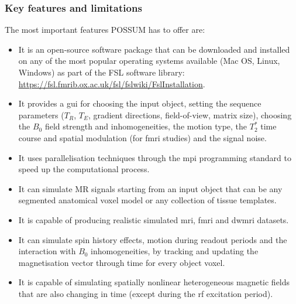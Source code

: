 \subsubsection{Key features and limitations}
The most important features POSSUM has to offer are:
\begin{itemize}
    
    \item It is an open-source software package that can be downloaded and installed on any of the most popular operating systems available (Mac OS, Linux, Windows) as part of the FSL software library: \url{https://fsl.fmrib.ox.ac.uk/fsl/fslwiki/FslInstallation}.
    
    \item It provides a \ac{gui} for choosing the input object, setting the sequence parameters ($T_R$, $T_E$, gradient directions, field-of-view, matrix size), choosing the $B_0$ field strength and inhomogeneities, the motion type, the $T_2^*$ time course and spatial modulation (for \ac{fmri} studies) and the signal noise.
    
    \item It uses parallelisation techniques through the \ac{mpi} programming standard to speed up the computational process.
    
    \item It can simulate MR signals starting from an input object that can be any segmented anatomical voxel model or any collection of tissue templates. 
    
    \item It is capable of producing realistic simulated \ac{mri}, \ac{fmri} and \ac{dwmri} datasets.
    
    \item It can simulate spin history effects, motion during readout periods and the interaction with $B_0$ inhomogeneities, by tracking and updating the magnetisation vector through time for every object voxel.
    
    \item It is capable of simulating spatially nonlinear heterogeneous magnetic fields that are also changing in time (except during the \ac{rf} excitation period).
    
\end{itemize}

\hfill


